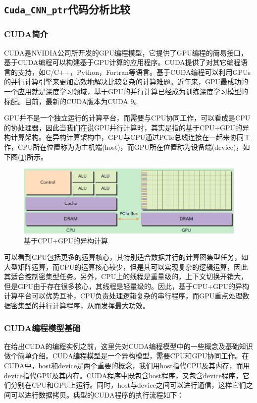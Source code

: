 \documentclass[UTF-8, a4paper, 12pt]{ctexart}
\begin{document}
\subsection{\colorbox[gray]{0.9}{\texttt{Cuda\_CNN\_ptr}}代码分析比较}


\subsubsection{CUDA简介}
CUDA是NVIDIA公司所开发的GPU编程模型，它提供了GPU编程的简易接口，基于CUDA编程可以构建基于GPU计算的应用程序。CUDA提供了对其它编程语言的支持，如C/C++，Python，Fortran等语言。基于CUDA编程可以利用GPUs的并行计算引擎来更加高效地解决比较复杂的计算难题。近年来，GPU最成功的一个应用就是深度学习领域，基于GPU的并行计算已经成为训练深度学习模型的标配。目前，最新的CUDA版本为CUDA 9。

GPU并不是一个独立运行的计算平台，而需要与CPU协同工作，可以看成是CPU的协处理器，因此当我们在说GPU并行计算时，其实是指的基于CPU+GPU的异构计算架构。在异构计算架构中，GPU与CPU通过PCIe总线连接在一起来协同工作，CPU所在位置称为为主机端(host)，而GPU所在位置称为设备端(device)，如下图(\ref{f11})所示。

\begin{figure}[htbp]
    \centering
    \includegraphics[width=16cm]{fig/f11.png}
    \caption{基于CPU+GPU的异构计算}
    \label{f11}
\end{figure}

可以看到GPU包括更多的运算核心，其特别适合数据并行的计算密集型任务，如大型矩阵运算，而CPU的运算核心较少，但是其可以实现复杂的逻辑运算，因此其适合控制密集型任务。另外，CPU上的线程是重量级的，上下文切换开销大，但是GPU由于存在很多核心，其线程是轻量级的。因此，基于CPU+GPU的异构计算平台可以优势互补，CPU负责处理逻辑复杂的串行程序，而GPU重点处理数据密集型的并行计算程序，从而发挥最大功效。



\subsubsection{CUDA编程模型基础}
在给出CUDA的编程实例之前，这里先对CUDA编程模型中的一些概念及基础知识做个简单介绍。CUDA编程模型是一个异构模型，需要CPU和GPU协同工作。在CUDA中，host和device是两个重要的概念，我们用host指代CPU及其内存，而用device指代GPU及其内存。CUDA程序中既包含host程序，又包含device程序，它们分别在CPU和GPU上运行。同时，host与device之间可以进行通信，这样它们之间可以进行数据拷贝。典型的CUDA程序的执行流程如下：
\end{document}
